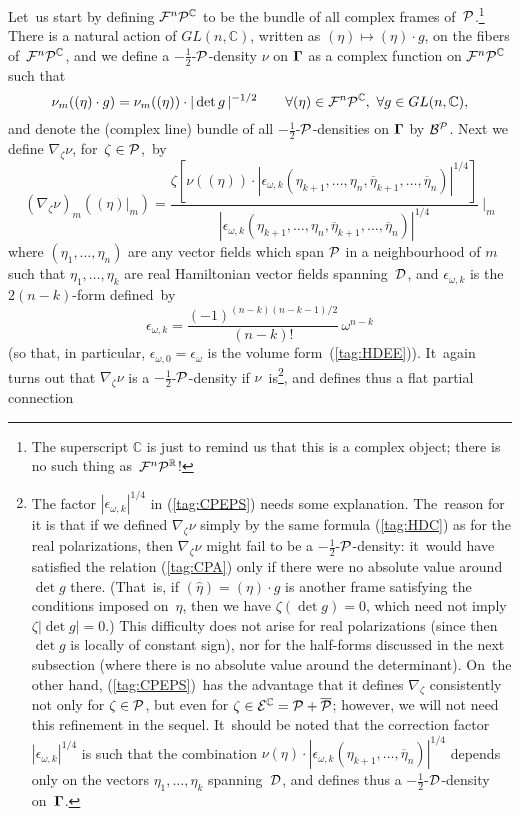 \documentclass[11pt]{amsart}
\numberwithin{equation}{section}
\theoremstyle{remark}
\newcommand\Omg{{\bigam}}   %
\newcommand\FF{\Cal F}
\newcommand\PP{{\Cal P}}
\newcommand\DD{{\Cal D}}
\newcommand\mhD{$-\tfrac12$-$\DD$}
\newcommand\BB{\Cal B}
\newcommand\EE{{\Cal E}}
\newcommand\FnPC{\FF^n\PP^\CC}
\newcommand\mhP{$-\tfrac12$-$\PP$}
\newcommand\RR{\mathbb R}
\newcommand{\CC}{\C}
\newcommand{\bigam}{\mbox{\boldmath $\Gamma$}}
\newcommand{\C}{\mathbb C}
\begin{document}
Let~us start by defining $\FnPC$ to be the bundle of all complex frames
of~$\PP$.\footnote{The superscript $\CC$ is just to remind us that this is a
complex object; there is no such thing as~$\FF^n\PP^\RR$!} There is a natural
action of $GL(n,\CC)$, written as $(\eta)\mapsto(\eta)\cdot g$, on the fibers
of~$\FnPC$, and we define a \mhP-density $\nu$ on $\Omg$ as a complex function
on $\FnPC$ such that
\begin{equation}  \nu_m((\eta)\cdot g) = \nu_m((\eta))\cdot |\det g\,|^{-1/2}
\qquad \forall (\eta)\in\FnPC,\ \forall g\in GL(n,\CC),  \label{tag:CPA}
\end{equation}
and denote the (complex line) bundle of all \mhP-densities on $\Omg$ by
$\BB^\PP$. Next we define $\nabla_\zeta\nu$, for~$\zeta\in\PP$,~by
\begin{equation}  (\nabla_\zeta \nu)_m ((\eta)|_m) = \frac{\zeta[\nu((\eta))
\cdot |\epsilon_{\omega,k}(\eta_{k+1},\dots,\eta_n,\overline\eta_{k+1},\dots,
\overline\eta_n)|^{1/4}]}
{|\epsilon_{\omega,k}(\eta_{k+1},\dots,\eta_n,\overline\eta_{k+1},\dots,
\overline\eta_n)|^{1/4}} \ \bigg|_m  \label{tag:CPEPS}  \end{equation}
where $(\eta_1,\dots,\eta_n)$ are any vector fields which span $\PP$ in a
neighbourhood of $m$ such that $\eta_1,\dots,\eta_k$ are real Hamiltonian
vector fields spanning~$\DD$, and $\epsilon_{\omega,k}$ is the $2(n-k)$-form
defined~by
\begin{equation}  \epsilon_{\omega,k} = \frac{(-1)^{(n-k)(n-k-1)/2}}{(n-k)!}
\,\omega^{n-k}  \label{tag:CPX}  \end{equation}
(so that, in particular, $\epsilon_{\omega,0}=\epsilon_\omega$ is the volume
form~(\ref{tag:HDEE})). It~again turns out that $\nabla_\zeta\nu$ is a
\mhP-density if $\nu$~is\footnote{The factor $|\epsilon_{\omega,k}|^{1/4}$ in
(\ref{tag:CPEPS}) needs some explanation. The~reason for it is that if we
defined $\nabla_\zeta\nu$ simply by the same formula (\ref{tag:HDC}) as for the
real polarizations, then $\nabla_\zeta\nu$ might fail to be a \mhP-density:
it~would have satisfied the relation (\ref{tag:CPA}) only if there were no
absolute value around $\det g$ there. (That~is, if $(\hat\eta)=(\eta)\cdot g$
is another frame satisfying the conditions imposed on~$\eta$, then we have
$\zeta(\det g)=0$, which need not imply $\zeta|\!\det g|=0$.) This difficulty
does not arise for real polarizations (since then $\det g$ is locally of
constant sign), nor for the half-forms discussed in the next subsection (where
there is no absolute value around the determinant). On~the other hand,
(\ref{tag:CPEPS})~has the advantage that it defines $\nabla_\zeta$ consistently
not only for $\zeta\in\PP$, but even for $\zeta\in \EE^\CC=\PP+\overline\PP$;
however, we will not need this refinement in the sequel. \endgraf It~should be
noted that the correction factor $|\epsilon_{\omega,k}|^{1/4}$ is such that the
combination
$\nu(\eta)\cdot|\epsilon_{\omega,k}(\eta_{k+1},\dots,\overline\eta_n)|^{1/4}$
depends only on the vectors $\eta_1,\dots,\eta_k$ spanning~$\DD$, and defines
thus a \mhD-density on~$\Omg$.}, and defines thus a flat partial connection
\end{document}
